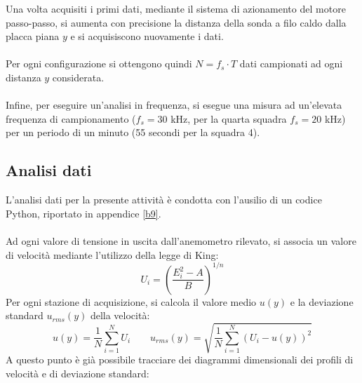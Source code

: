Una volta acquisiti i primi dati, mediante il sistema di azionamento del motore passo-passo, si aumenta con precisione la distanza della sonda a filo caldo dalla placca piana $y$ e si acquisiscono nuovamente i dati.\\\\
Per ogni configurazione si ottengono quindi $N = f_s\cdot T$ dati campionati ad ogni distanza $y$ considerata.\\\\
Infine, per eseguire un'analisi in frequenza, si esegue una misura ad un'elevata frequenza di campionamento ($f_s=30$ kHz, per la quarta squadra $f_s=20$ kHz) per un periodo di un minuto (55 secondi per la squadra 4).

\subsection{Analisi dati}
L'analisi dati per la presente attività è condotta con l'ausilio di un codice Python, riportato in appendice \ref{b9}.\\\\
Ad ogni valore di tensione in uscita dall'anemometro rilevato, si associa un valore di velocità mediante l'utilizzo della legge di King:
\begin{equation*}
    U_i = \left( \frac{E_i^2-A}B \right)^{1/n}
\end{equation*}
Per ogni stazione di acquisizione, si calcola il valore medio $u(y)$ e la deviazione standard $u_{rms}(y)$ della velocità:
\begin{equation*}
    u(y) = \frac{1}{N}\sum_{i=1}^{N} U_i \qquad u_{rms}(y) = \sqrt{\frac{1}{N}\sum_{i=1}^{N}{\left(U_i - u(y)\right)^2}}
\end{equation*}
A questo punto è già possibile tracciare dei diagrammi dimensionali dei profili di velocità e di deviazione standard:
